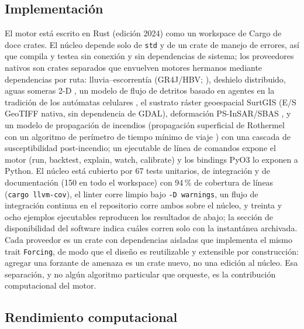 \documentclass[authoryear,preprint,review,12pt]{elsarticle}
\begin{document}
\subsection{Implementación}

El motor está escrito en Rust (edición 2024) como un workspace de Cargo de doce
crates. El núcleo depende solo de \texttt{std} y de un crate de manejo de errores,
así que compila y testea sin conexión y sin dependencias de sistema; los
proveedores nativos son crates separados que envuelven motores hermanos mediante
dependencias por ruta: lluvia--escorrentía (GR4J/HBV;
\citealp{perrin2003,seibert2012}), deshielo distribuido, aguas someras 2-D
\citep{audusse2004,toro1994}, un modelo de flujo de detritos basado en agentes en
la tradición de los autómatas celulares \citep{dambrosio2003}, el sustrato ráster geoespacial SurtGIS \citep{parra2026surtgis} (E/S GeoTIFF nativa, sin dependencia de GDAL), deformación
PS-InSAR/SBAS \citep{ferretti2001,berardino2002}, y un modelo de propagación de
incendios (propagación superficial de Rothermel \citep{andrews2018} con un
algoritmo de perímetro de tiempo mínimo de viaje \citep{finney1998}) con una
cascada de susceptibilidad post-incendio; un ejecutable de línea de comandos expone
el motor (run, backtest, explain, watch, calibrate) y los bindings PyO3 lo exponen
a Python. El núcleo está cubierto por 67 tests unitarios, de integración y de documentación (150 en todo el workspace) con 94\,\% de cobertura de líneas (\texttt{cargo llvm-cov}), el linter corre limpio bajo \texttt{-D warnings}, un flujo de integración continua en el repositorio corre ambos sobre el núcleo, y treinta y ocho ejemplos ejecutables reproducen los resultados de abajo; la sección
de disponibilidad del software indica cuáles corren solo con la instantánea archivada. Cada proveedor es un
crate con dependencias aisladas que implementa el mismo trait \texttt{Forcing}, de
modo que el diseño es reutilizable y extensible por construcción: agregar una
forzante de amenaza es un crate nuevo, no una edición al núcleo. Esa separación, y
no algún algoritmo particular que orqueste, es la contribución computacional del
motor.

\subsection{Rendimiento computacional}
\end{document}
